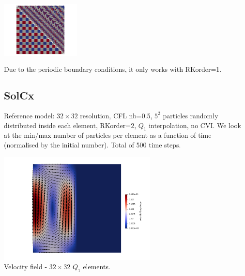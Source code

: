 \begin{center}
\includegraphics[width=4cm]{python_codes/fieldstone_30/results_couette/particles0050}
\end{center}

Due to the periodic boundary conditions, it only works with {\python RKorder}=1.

\newpage
\subsection*{SolCx}

Reference model: $32\times 32$ resolution, CFL nb=0.5, $5^2$ particles randomly distributed inside each 
element, RKorder=2, $Q_1$ interpolation, no CVI.
We look at the min/max number of particles per element as a function of time (normalised 
by the initial number). Total of 500 time steps.

\begin{center}
\includegraphics[width=8cm]{python_codes/fieldstone_30/results_solcx/vel}\\
{\captionfont Velocity field - $32\times 32$ $Q_1$ elements.}
\end{center}

